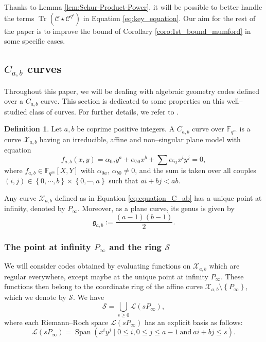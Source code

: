 \documentclass[lettersize,journal]{IEEEtran}
\theoremstyle{plain}
\theoremstyle{definition}
\newtheorem{definition}[thm]{Definition}
\theoremstyle{remark}
\DeclareMathOperator{\trace}{Tr}
\newcommand{\calL}{\mathcal{L}}
\newcommand{\calC}{\mathcal{C}}
\newcommand{\calS}{\mathcal{S}}
\newcommand{\calX}{\mathcal{X}}
\newcommand{\fqm}{\mathbb{F}_{q^m}}
\newcommand{\Tr}[1]{\trace\!\left(#1\right)}
\newcommand{\set}[1]{\left\{#1\right\}}
\newcommand{\Span}[1]{\operatorname{Span}\left(#1\right)}
\begin{document}
	Thanks to Lemma \ref{lem:Schur-Product-Power}, it will be possible to better handle the terms $\Tr{\calC\star \calC^{q^i}}$ in Equation \eqref{eq:key_equation}. Our aim for the rest of the paper is to improve the bound of Corollary \ref {coro:1st_bound_mumford} in some specific cases.
	
	\subsection{$C_{a,b}$ curves} \label{section:C_a,b_codes}
	Throughout this paper, we will be dealing with algebraic geometry codes defined over a $C_{a,b}$ curve. This section is dedicated to some properties on this well--studied class of curves. For further details, we refer to \cite{Miu93}. 
	
	\begin{definition} \label{def:C_ab_curves} 
		Let $a,b$ be coprime positive integers. A $C_{a,b}$ curve over $\fqm$ is a curve $\calX_{a,b}$ having an irreducible, affine and non--singular plane model with equation
		\begin{equation} \label{eq:equation_C_ab}
			f_{a,b}(x,y) = \alpha_{0a}y^a + \alpha_{b0}x^b + \sum \alpha_{ij}x^iy^j = 0,
		\end{equation}
		where $f_{a,b} \in \fqm[X,Y]$ with $\alpha_{0a}, \: \alpha_{b0} \neq 0$, and the sum is taken over all couples $(i,j) \in \set{0,\cdots,b} \times \set{0,\cdots,a}$ such that $ai+bj < ab$.
	\end{definition}
	Any curve $\calX_{a,b}$ defined as in Equation \eqref{eq:equation_C_ab} has a unique point at infinity, denoted by $P_{\infty}$. Moreover, as a plane curve, its genus is given by
	\[\mathfrak{g}_{a,b}:=\dfrac{(a-1)(b-1)}{2}.\]
	
	\subsubsection{The point at infinity $P_\infty$ and the ring $\calS$}
	
	We will consider codes obtained by evaluating functions on $\calX_{a,b}$ which are regular everywhere, except maybe at the unique point at infinity $P_\infty$. These functions then belong to the coordinate ring of the affine curve $\calX_{a,b} \setminus \set{P_\infty}$, which we denote by $\calS$. We have
	\begin{equation}\label{eq:O_Pinf}
		\calS=\bigcup_{s \geq 0} \calL(s P_\infty),
	\end{equation} %
	where each Riemann--Roch space $\calL(s P_\infty)$ has an explicit basis as follows:
	\begin{equation} \label{eq:basis_L(sP_inf)}
		\calL(sP_{\infty}) = \Span{x^iy^j \mid 0 \leq i, 0\leq j\leq a-1 \ \mathrm{and} \ ai+bj \leq s}.
	\end{equation}
	
\end{document}
